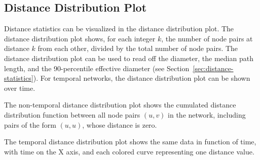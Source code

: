\documentclass{article}
\begin{document}
\subsection{Distance Distribution Plot}
Distance statistics can be visualized in the distance distribution plot.
The distance distribution plot shows, for each integer $k$, the number
of node pairs at distance $k$ from each other, divided by the total
number of node pairs.  The distance distribution plot can be used to
read off the diameter, the median path length, and the 90-percentile
effective diameter (see Section~\ref{sec:distance-statistics}).  For
temporal networks, the distance distribution plot can be shown over
time.

The non-temporal distance distribution plot shows the cumulated distance
distribution function between all node pairs $(u,v)$ in the network,
including pairs of the form $(u,u)$, whose distance is zero.

The temporal distance distribution plot shows the same data in function
of time, with time on the X axis, and each colored curve representing
one distance value.
\end{document}
